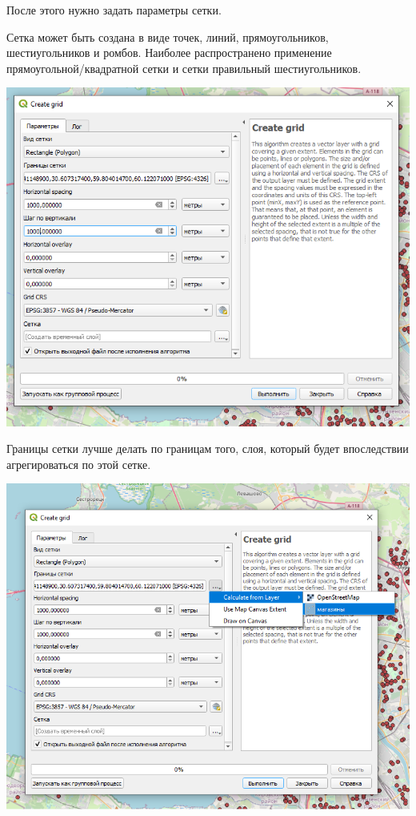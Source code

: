 \documentclass[
]{book}
\begin{document}
После этого нужно задать параметры сетки.

Сетка может быть создана в виде точек, линий, прямоугольников, шестиугольников и ромбов. Наиболее распространено применение прямоугольной/квадратной сетки и сетки правильный шестиугольников.

\includegraphics{figures/14.png}

Границы сетки лучше делать по границам того, слоя, который будет впоследствии агрегироваться по этой сетке.

\includegraphics{figures/15.png}
\end{document}
